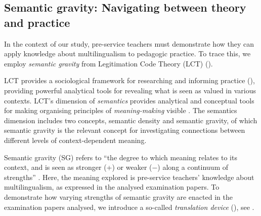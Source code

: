 \documentclass[output=paper]{langscibook}
\begin{document}
\subsection{Semantic gravity: Navigating between theory and practice}\label{sec:ostergaard:3.2}

In the context of our study, pre-service teachers must demonstrate how they can apply knowledge about multilingualism to pedagogic practice. To trace this, we employ \textit{semantic gravity} from Legitimation Code Theory (LCT) (\citealt{Maton2014}).

LCT provides a sociological framework for researching and informing practice (\citealt{Maton2014}), providing powerful analytical tools for revealing what is seen as valued in various contexts. LCT’s dimension of \textit{semantics} provides analytical and conceptual tools for making organising principles of \textit{meaning-making} visible \citep{Maton2014}. The semantics dimension includes two concepts, semantic density and semantic gravity, of which semantic gravity is the relevant concept for investigating connections between different levels of context-dependent meaning.

Semantic gravity (SG) refers to “the degree to which meaning relates to its context, and is seen as stronger (+) or weaker (−) along a continuum of strengths” \citep[63]{Maton2014}. Here, the meaning explored is pre-service teachers’ knowledge about multilingualism, as expressed in the analysed examination papers. To demonstrate how varying strengths of semantic gravity are enacted in the examination papers analysed, we introduce a so-called \textit{translation device} (\citealt{MatonChen2016,MatonDoran2017}), see .
\end{document}
